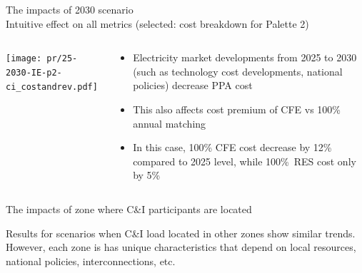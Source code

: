 \begin{frame}{The impacts of 2030 scenario\\
Intuitive effect on all metrics (selected: cost breakdown for Palette 2)}

\begin{columns}[T]
\begin{column}{9cm}
\centering

\texttt{[image: pr/25-2030-IE-p2-ci\_costandrev.pdf]}
\end{column}
\begin{column}{5cm}

  \begin{itemize}
  \item Electricity market developments from 2025 to 2030 (such as technology cost developments, national policies) \alert{decrease PPA cost}
  \item This also \alert{affects cost premium} of CFE vs 100\% annual matching 
  \item In this case, 100\% CFE cost decrease by 12\% compared to 2025 level, while 100\%~RES cost only by 5\%
 
  \end{itemize}
\end{column}
\end{columns}

\end{frame}



\begin{frame}{The impacts of zone where C\&I participants are located}
\centering

Results for scenarios when C\&I load located in other zones show \alert{similar trends.} \\ 
However, each zone is has \alert{unique characteristics} that depend on local resources, national policies, interconnections, etc.

\end{frame}



